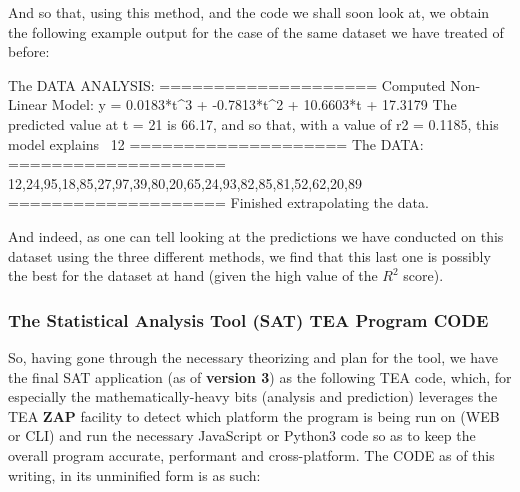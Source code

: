 \documentclass[a4paper, 18pt]{book} %
\begin{document}
\vspace{2em}

And so that, using this method, and the code we shall soon look at, we obtain the following example output for the case of the same dataset we have treated of before:


 \begin{tcbverbatim}[title=Sample OUTPUT DATA ANALYSIS (Predictive Non-Linear) of Dataset of 20 Random Numbers (Ages)]
The DATA ANALYSIS:
====================
Computed Non-Linear Model: y = 0.0183*t^3 + -0.7813*t^2 + 10.6603*t + 17.3179
The predicted value at t = 21 is 66.17, and so that, with a value of r2 = 0.1185, this model explains ~12%
====================
The DATA:
====================
12,24,95,18,85,27,97,39,80,20,65,24,93,82,85,81,52,62,20,89
====================
Finished extrapolating the data.
  \end{tcbverbatim}


\vspace{2em}

And indeed, as one can tell looking at the predictions we have conducted on this dataset using the three different methods, we find that this last one is possibly the best for the dataset at hand (given the high value of the $R^2$ score).

\vspace{2em}

\subsubsection{The Statistical Analysis Tool (SAT) TEA Program CODE}

So, having gone through the necessary theorizing and plan for the tool, we have the final SAT application (as of \textbf{version 3}) as the following TEA code, which, for especially the mathematically-heavy bits (analysis and prediction) leverages the TEA \textbf{ZAP} facility to detect which platform the program is being run on (WEB or CLI) and run the necessary JavaScript or Python3 code so as to keep the overall program accurate, performant and cross-platform. The CODE as of this writing, in its unminified form is as such:


\vspace{2em}
\end{document}
